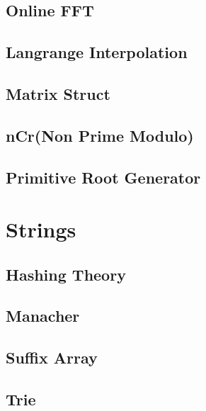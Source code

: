\subsection{Online FFT}
\raggedbottom
\subsection{Langrange Interpolation}
\raggedbottom
\subsection{Matrix Struct}
\raggedbottom
\subsection{nCr(Non Prime Modulo)}
\raggedbottom
\subsection{Primitive Root Generator}
\raggedbottom

\section{Strings}
\subsection{Hashing Theory}
\raggedbottom
\subsection{Manacher}
\raggedbottom
\subsection{Suffix Array}
\raggedbottom
\subsection{Trie}
\raggedbottom
